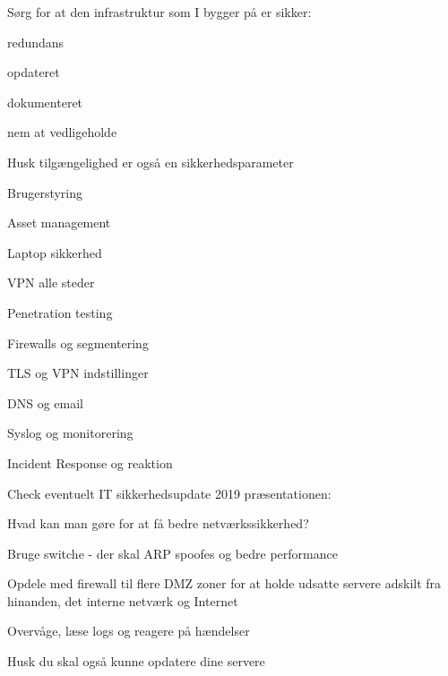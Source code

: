 \documentclass[Screen16to9,17pt]{foils}
\begin{document}

\begin{list1}
\item Sørg for at den infrastruktur som I bygger på er sikker:
\begin{list2}
 \item redundans
       \item opdateret
        \item dokumenteret
        \item nem at vedligeholde
\end{list2}

\item  Husk tilgængelighed er også en sikkerhedsparameter
\end{list1}

\begin{list2}
\item Brugerstyring
\item Asset management
\item Laptop sikkerhed
\item VPN alle steder
\item Penetration testing
\item Firewalls og segmentering
\item TLS og VPN indstillinger
\item DNS og email
\item Syslog og monitorering
\item Incident Response og reaktion
\end{list2}

Check eventuelt IT sikkerhedsupdate 2019 præsentationen:\\
{\small{}}



\begin{list1}
\item Hvad kan man gøre for at få bedre netværkssikkerhed?
\begin{list2}
\item Bruge switche - der skal ARP spoofes og bedre performance
\item Opdele med firewall til flere DMZ zoner for at holde
      udsatte servere adskilt fra hinanden, det interne netværk og
      Internet
\item Overvåge, læse logs og reagere på hændelser
\end{list2}
\item Husk du skal også kunne opdatere dine servere
\end{list1}
\end{document}
